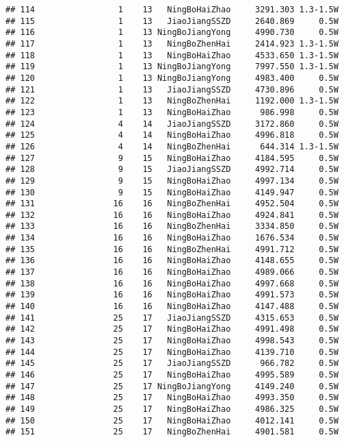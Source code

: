\documentclass[]{article}
\begin{document}
\begin{verbatim}
## 114                 1    13   NingBoHaiZhao     3291.303 1.3-1.5W
## 115                 1    13   JiaoJiangSSZD     2640.869     0.5W
## 116                 1    13 NingBoJiangYong     4990.730     0.5W
## 117                 1    13   NingBoZhenHai     2414.923 1.3-1.5W
## 118                 1    13   NingBoHaiZhao     4533.650 1.3-1.5W
## 119                 1    13 NingBoJiangYong     7997.550 1.3-1.5W
## 120                 1    13 NingBoJiangYong     4983.400     0.5W
## 121                 1    13   JiaoJiangSSZD     4730.896     0.5W
## 122                 1    13   NingBoZhenHai     1192.000 1.3-1.5W
## 123                 1    13   NingBoHaiZhao      986.998     0.5W
## 124                 4    14   JiaoJiangSSZD     3172.860     0.5W
## 125                 4    14   NingBoHaiZhao     4996.818     0.5W
## 126                 4    14   NingBoZhenHai      644.314 1.3-1.5W
## 127                 9    15   NingBoHaiZhao     4184.595     0.5W
## 128                 9    15   JiaoJiangSSZD     4992.714     0.5W
## 129                 9    15   NingBoHaiZhao     4997.134     0.5W
## 130                 9    15   NingBoHaiZhao     4149.947     0.5W
## 131                16    16   NingBoZhenHai     4952.504     0.5W
## 132                16    16   NingBoHaiZhao     4924.841     0.5W
## 133                16    16   NingBoZhenHai     3334.850     0.5W
## 134                16    16   NingBoHaiZhao     1676.534     0.5W
## 135                16    16   NingBoZhenHai     4991.712     0.5W
## 136                16    16   NingBoHaiZhao     4148.655     0.5W
## 137                16    16   NingBoHaiZhao     4989.066     0.5W
## 138                16    16   NingBoHaiZhao     4997.668     0.5W
## 139                16    16   NingBoHaiZhao     4991.573     0.5W
## 140                16    16   NingBoHaiZhao     4147.488     0.5W
## 141                25    17   JiaoJiangSSZD     4315.653     0.5W
## 142                25    17   NingBoHaiZhao     4991.498     0.5W
## 143                25    17   NingBoHaiZhao     4998.543     0.5W
## 144                25    17   NingBoHaiZhao     4139.710     0.5W
## 145                25    17   JiaoJiangSSZD      966.782     0.5W
## 146                25    17   NingBoHaiZhao     4995.589     0.5W
## 147                25    17 NingBoJiangYong     4149.240     0.5W
## 148                25    17   NingBoHaiZhao     4993.350     0.5W
## 149                25    17   NingBoHaiZhao     4986.325     0.5W
## 150                25    17   NingBoHaiZhao     4012.141     0.5W
## 151                25    17   NingBoZhenHai     4901.581     0.5W

\end{verbatim}
\end{document}
